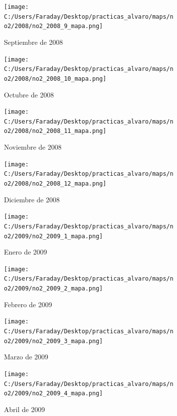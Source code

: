 \documentclass[12pt]{article}
\begin{document}
\begin{figure}[H]
\centering
\begin{subfigure}[h]{0.45\textwidth}
\texttt{[image: C:/Users/Faraday/Desktop/practicas\_alvaro/maps/no2/2008/no2\_2008\_9\_mapa.png]}
\caption{Septiembre de 2008}
\label{fig:map-mon-1-9-2008}
\end{subfigure}
%
\begin{subfigure}[H]{0.45\textwidth}
\texttt{[image: C:/Users/Faraday/Desktop/practicas\_alvaro/maps/no2/2008/no2\_2008\_10\_mapa.png]}
\caption{Octubre de 2008}
\label{fig:map-mon-1-10-2008}
\end{subfigure}
\caption{}
\end{figure}

\newpage

\begin{figure}[H]
\centering
\begin{subfigure}[h]{0.45\textwidth}
\texttt{[image: C:/Users/Faraday/Desktop/practicas\_alvaro/maps/no2/2008/no2\_2008\_11\_mapa.png]}
\caption{Noviembre de 2008}
\label{fig:map-mon-1-11-2008}
\end{subfigure}
%
\begin{subfigure}[H]{0.45\textwidth}
\texttt{[image: C:/Users/Faraday/Desktop/practicas\_alvaro/maps/no2/2008/no2\_2008\_12\_mapa.png]}
\caption{Diciembre de 2008}
\label{fig:map-mon-1-12-2008}
\end{subfigure}
\caption{}
\end{figure}

\begin{figure}[H]
\centering
\begin{subfigure}[h]{0.45\textwidth}
\texttt{[image: C:/Users/Faraday/Desktop/practicas\_alvaro/maps/no2/2009/no2\_2009\_1\_mapa.png]}
\caption{Enero de 2009}
\label{fig:map-mon-1-1-2009}
\end{subfigure}
%
\begin{subfigure}[H]{0.45\textwidth}
\texttt{[image: C:/Users/Faraday/Desktop/practicas\_alvaro/maps/no2/2009/no2\_2009\_2\_mapa.png]}
\caption{Febrero de 2009}
\label{fig:map-mon-1-2-2009}
\end{subfigure}
\caption{}
\end{figure}

\begin{figure}[H]
\centering
\begin{subfigure}[h]{0.45\textwidth}
\texttt{[image: C:/Users/Faraday/Desktop/practicas\_alvaro/maps/no2/2009/no2\_2009\_3\_mapa.png]}
\caption{Marzo de 2009}
\label{fig:map-mon-1-3-2009}
\end{subfigure}
%
\begin{subfigure}[H]{0.45\textwidth}
\texttt{[image: C:/Users/Faraday/Desktop/practicas\_alvaro/maps/no2/2009/no2\_2009\_4\_mapa.png]}
\caption{Abril de 2009}
\label{fig:map-mon-1-4-2009}
\end{subfigure}
\caption{}
\end{figure}
\end{document}
